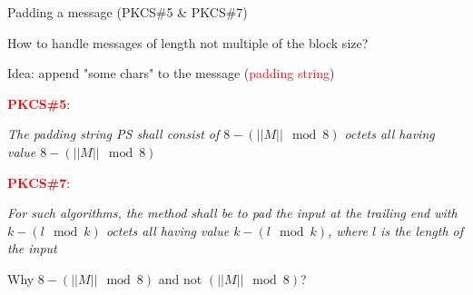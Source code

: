 \begin{frame}{Padding a message (PKCS\#5 \& PKCS\#7)}


How to handle messages of length not multiple of the block size?

\smallskip

Idea: append "some chars" to the message (\textcolor{red}{padding string})

\bigskip

\textcolor{red}{\textbf{PKCS\#5}}:

\textit{The padding string PS shall consist of $8 - (||M|| \mod 8)$ octets all having value $8 - (||M|| \mod 8)$}

\bigskip

\textcolor{red}{\textbf{PKCS\#7}}:

\textit{For such algorithms, the method shall be to pad the input at the trailing end with $k - (l \mod k)$ octets all having value $k - (l \mod k)$, where $l$ is the length of the input}

\bigskip

Why $8 - (||M|| \mod 8)$ and not $(||M|| \mod 8)$?

\end{frame}

